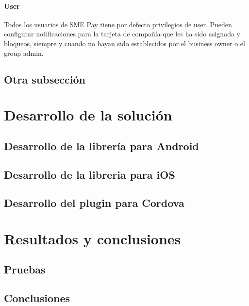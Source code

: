 \documentclass[a4paper, 12pt]{article}
\begin{document}
\paragraph{User}
\label{sec-3-1-5-3}
\label{sec:user}
Todos los usuarios de SME Pay tiene por defecto privilegios de user. Pueden configurar notificaciones para la tarjeta de compañía que les ha sido asignada y bloqueos, siempre y cuando no hayan sido
establecidos por el business owner o el group admin.

\subsection{Otra subsección}
\label{sec-3-2}

\section{Desarrollo de la solución}
\label{sec-4}
\subsection{Desarrollo de la librería para Android}
\label{sec-4-1}
\subsection{Desarrollo de la libreria para iOS}
\label{sec-4-2}
\subsection{Desarrollo del plugin para Cordova}
\label{sec-4-3}

\section{Resultados y conclusiones}
\label{sec-5}

\subsection{Pruebas}
\label{sec-5-1}

\subsection{Conclusiones}
\label{sec-5-2}

\printbibliography[heading=bibnumbered] %
\end{document}
